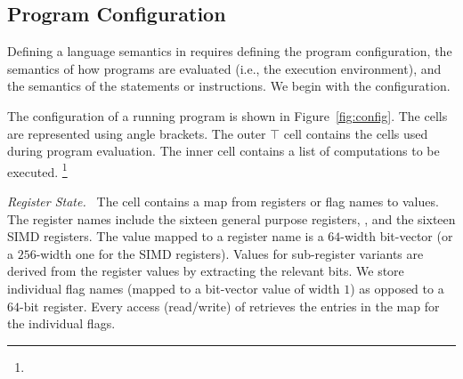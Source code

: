 


\subsection{Program Configuration}\label{sec:x86sema}
Defining a language semantics in \K requires defining the program configuration, the semantics of how programs are evaluated (i.e., the execution environment), and the semantics of the statements or instructions.  We begin with the configuration.



The \K configuration of a running \ISA program is shown in Figure~\ref{fig:config}. The cells are represented using angle brackets. The outer $\top$ cell contains the cells used during program evaluation.
The inner  cell contains a list of computations to be executed. \footnote{%
}

\emph{Register State.~}
The  cell contains a  map from registers or flag names to values.  The register names include the sixteen general purpose registers, , and the sixteen SIMD registers.  The value mapped to a register name is a $64$-width bit-vector (or a $256$-width one for the SIMD registers). Values for sub-register variants are derived from the register values by extracting the relevant bits. We store individual flag names (mapped to a bit-vector value of width $1$) as opposed to a $64$-bit  register. Every access (read/write) of  retrieves the entries in the  map for the individual flags.

